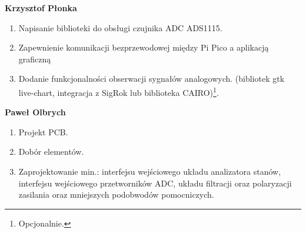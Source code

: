    \textbf{Krzysztof Płonka}
    \begin{enumerate}
        \item Napisanie biblioteki do obsługi czujnika ADC ADS1115.
        \item Zapewnienie komunikacji bezprzewodowej między Pi Pico a aplikacją graficzną
        \item Dodanie funkcjonalności obserwacji sygnałów analogowych.
        (bibliotek gtk live-chart, integracja z SigRok lub biblioteka CAIRO)\footnote{Opcjonalnie.}.\\ 
    \end{enumerate}

    \textbf{Paweł Olbrych}
    \begin{enumerate}
        \item Projekt PCB.
        \item Dobór elementów.
        \item Zaprojektowanie min.: interfejsu wejściowego układu analizatora stanów,
        interfejsu wejściowego przetworników ADC, układu filtracji oraz polaryzacji zasilania oraz
        mniejszych podobwodów pomocniczych. 
    \end{enumerate}
    